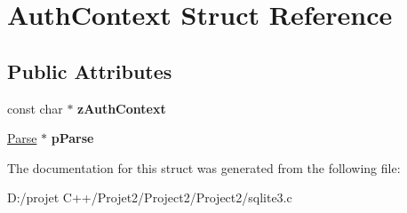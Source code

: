 \hypertarget{struct_auth_context}{}\section{Auth\+Context Struct Reference}
\label{struct_auth_context}
\subsection*{Public Attributes}
\begin{DoxyCompactItemize}
\item 
\mbox{\label{struct_auth_context_a1b095b152b72326476ac3f7edcaee78a}} 
const char $\ast$ {\bfseries z\+Auth\+Context}
\item 
\mbox{\label{struct_auth_context_a8df2931d8f4facf59073c92315b00bfa}} 
\mbox{\hyperlink{struct_parse}{Parse}} $\ast$ {\bfseries p\+Parse}
\end{DoxyCompactItemize}


The documentation for this struct was generated from the following file\+:\begin{DoxyCompactItemize}
\item 
D\+:/projet C++/\+Projet2/\+Project2/\+Project2/sqlite3.\+c\end{DoxyCompactItemize}

